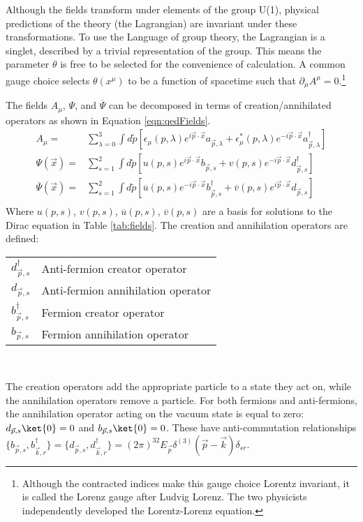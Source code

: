 Although the fields transform under elements of the group U(1), physical predictions of the theory (the Lagrangian) are invariant under these transformations.
To use the Language of group theory, the Lagrangian is a singlet, described by a trivial representation of the group. 
This means the parameter $\theta$ is free to be selected for the convenience of calculation. 
A common gauge choice selects $\theta(x^\mu)$ to be a function of spacetime such that $\partial_\mu A^\mu=0$.\footnote{Although the contracted indices make this gauge choice Lorentz invariant, it is called the Lorenz gauge after Ludvig Lorenz. The two physicists independently developed the Lorentz-Lorenz equation.}
\check

The fields $A_\mu$, $\Psi$, and $\overline{\Psi}$ can be decomposed in terms of creation/annihilated operators as shown in Equation \ref{eqn:qedFields}.
\begin{equation}\begin{split}\label{eqn:qedFields}
A_\mu=&\sum_{\lambda=0}^3\int d\tilde{p}[\epsilon_\mu(p,\lambda)e^{i\vec{p}\cdot\vec{x}}a_{\vec{p},\lambda}+\epsilon^*_\mu(p,\lambda)e^{-i\vec{p}\cdot\vec{x}}a^\dagger_{\vec{p},\lambda}] \\
\Psi(\vec{x})=&\sum_{s=1}^2\int d\tilde{p}[u(p,s)e^{i\vec{p}\cdot\vec{x}}b_{\vec{p},s}+v(p,s)e^{-i\vec{p}\cdot\vec{x}}d^\dagger_{\vec{p},s}] \\
\overline{\Psi}(\vec{x})=&\sum_{s=1}^2\int d\tilde{p}[\overline{u}(p,s)e^{-i\vec{p}\cdot\vec{x}}b^\dagger_{\vec{p},s}+\overline{v}(p,s)e^{i\vec{p}\cdot\vec{x}}d_{\vec{p},s}] \\
\end{split}\end{equation}
Where $u(p,s)$, $v(p,s)$, $\overline{u}(p,s)$, $\overline{v}(p,s)$ are a basis for solutions to the Dirac equation in Table \ref{tab:fields}.
The creation and annihilation operators are defined:  \\
    \begin{center}
        \begin{tabular}{l l}\toprule
        $d_{\vec{p},s}^\dagger$ & Anti-fermion creator operator \\
        $d_{\vec{p},s}$ & Anti-fermion annihilation operator    \\
        $b_{\vec{p},s}^\dagger$ & Fermion creator operator \\
        $b_{\vec{p},s}$ & Fermion annihilation operator    \\
        \bottomrule\end{tabular} \\
    \end{center} 
The creation operators add the appropriate particle to a state they act on, while the annihilation operators remove a particle.
For both fermions and anti-fermions, the annihilation operator acting on the vacuum state is equal to zero: $d_{\vec{p},s}\ket{0}=0$ and $b_{\vec{p},s}\ket{0}=0$.
These have anti-commutation relationships \mbox{$\{b_{\vec{p},s},b_{\vec{k},r}^\dagger\}=\{d_{\vec{p},s},d_{\vec{k},r}^\dagger\}=(2\pi)^32E_{\vec{p}}\delta^{(3)}(\vec{p}-\vec{k})\delta_{sr}$}.

